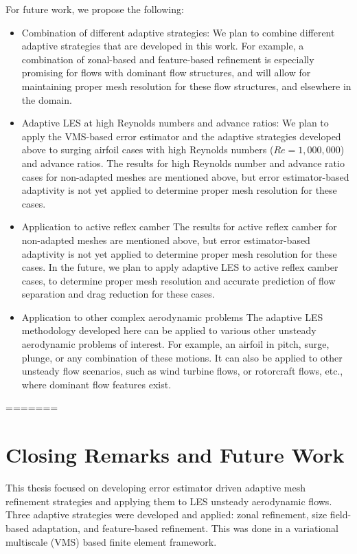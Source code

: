 For future work, we propose the following:

\begin{itemize}
	\item Combination of different adaptive strategies:
	We plan to combine different adaptive strategies that are developed in this work. For example, a combination of zonal-based and feature-based refinement is especially promising for flows with dominant flow structures, and will allow for maintaining proper mesh resolution for these flow structures, and elsewhere in the domain.
	
	\item Adaptive LES at high Reynolds numbers and advance ratios:
	We plan to apply the VMS-based error estimator and the adaptive strategies developed above to
	surging airfoil cases with high Reynolds numbers ($Re=1,000,000$) and advance ratios. The results for high Reynolds number and advance ratio cases for non-adapted meshes are mentioned above, but error estimator-based adaptivity is not yet applied to determine proper mesh resolution for these cases.
	
	\item Application to active reflex camber
	The results for active reflex camber for non-adapted meshes are mentioned above, but error estimator-based	adaptivity is not yet applied to determine proper mesh resolution for these cases. In the future, we plan to apply adaptive LES to active reflex camber cases, to determine proper mesh resolution and accurate prediction of flow separation and drag reduction for these cases.
	
	\item Application to other complex aerodynamic problems
	The adaptive LES methodology developed here can be applied to various other unsteady aerodynamic problems of interest. For example, an airfoil in pitch, surge, plunge, or any combination of these motions.
	It can also be applied to other unsteady flow scenarios, such as wind turbine flows, or rotorcraft flows, etc., where dominant flow features exist. 
	
	
	
\end{itemize}
=======
\chapter{Closing Remarks and Future Work}

This thesis focused on developing error estimator driven adaptive mesh refinement strategies and applying them to LES unsteady aerodynamic flows.
Three adaptive strategies were developed and applied: zonal refinement, size field-based adaptation, and
feature-based refinement. This was done in a variational multiscale (VMS) based finite element framework.

